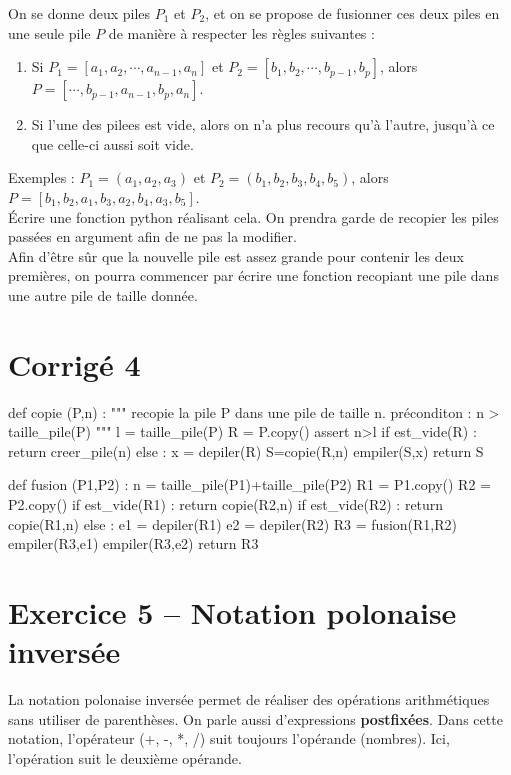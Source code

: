 On se donne deux piles $P_1$ et $P_2$, et on se propose de fusionner ces deux piles en une seule pile $P$ de manière 
à respecter les règles suivantes :
\begin{enumerate}
\item Si $P_1=[a_1,a_2,\cdots,a_{n-1},a_n]$ et $P_2=[b_1,b_2,\cdots,b_{p-1},b_p]$, alors 
$P=[\cdots,b_{p-1},a_{n-1},b_p,a_n]$.
\item Si l'une des pilees est vide, alors on n'a plus recours qu'à l'autre, jusqu'à ce que celle-ci aussi soit vide.
\end{enumerate}
Exemples : $P_1=(a_1,a_2,a_3)$ et $P_2=(b_1,b_2,b_3,b_4,b_5)$, alors $P=[b_1,b_2,a_1,b_3,a_2,b_4,a_3,b_5]$.\\

Écrire une fonction python réalisant cela. On prendra garde de recopier les piles passées en argument afin de ne pas la 
modifier.\\
Afin d'être sûr que la nouvelle pile est assez grande pour contenir les deux premières, on pourra commencer par écrire 
une fonction recopiant une pile dans une autre pile de taille donnée.

\ifprof

\section*{Corrigé 4}


\begin{python}
def copie (P,n) :
    """ recopie la pile P dans une pile de taille n.
    préconditon : n > taille_pile(P) """
    l = taille_pile(P)
    R = P.copy()
    assert n>l
    if est_vide(R) :
        return creer_pile(n)
    else :
        x = depiler(R)
        S=copie(R,n)
        empiler(S,x)
        return S

def fusion (P1,P2) :
    n = taille_pile(P1)+taille_pile(P2)
    R1 = P1.copy()
    R2 = P2.copy()
    if est_vide(R1) :
        return copie(R2,n)
    if est_vide(R2) :
        return copie(R1,n)
    else :        
        e1 = depiler(R1)
        e2 = depiler(R2)
        R3 = fusion(R1,R2)
        empiler(R3,e1)
        empiler(R3,e2)
        return R3 
\end{python} 
\else \fi



\section*{Exercice 5 -- Notation polonaise inversée}
\setcounter{exo}{0}
La notation polonaise inversée permet de réaliser des opérations arithmétiques sans utiliser de parenthèses. On parle aussi d'expressions \textbf{postfixées}. Dans cette notation, l'opérateur (+, -, *, /) suit toujours l'opérande (nombres). Ici, l'opération suit le deuxième opérande.

